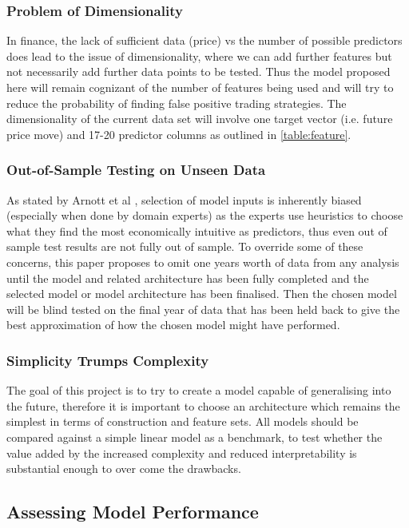 \documentclass[11pt]{article}
\begin{document}
\subsubsection{Problem of Dimensionality}
 In finance, the lack of sufficient data (price) vs the number of possible predictors does lead to the issue of dimensionality, where we can add further features but not necessarily add further data points to be tested. Thus the model proposed here will remain cognizant of the number of features being used and will try to reduce the probability of finding false positive trading strategies. The dimensionality of the current data set will involve one target vector (i.e. future price move) and 17-20 predictor columns as outlined in \ref{table:feature}.
\subsubsection{Out-of-Sample Testing on Unseen Data}
 As stated by Arnott et al \cite{Arnott2018}, selection of model inputs is inherently biased (especially when done by domain experts) as the experts use heuristics to choose what they find the most economically intuitive as predictors, thus even out of sample test results are not fully out of sample. To override some of these concerns, this paper proposes to omit one years worth of data from any analysis until the model and related architecture has been fully completed and the selected model or model architecture has been finalised. Then the chosen model will be blind tested on the final year of data that has been held back to give the best approximation of how the chosen model might have performed. 
\subsubsection{Simplicity Trumps Complexity}
The goal of this project is to try to create a model capable of generalising into the future, therefore it is important to choose an architecture which remains the simplest in terms of construction and feature sets. All models should be compared against a simple linear model as a benchmark, to test whether the value added by the increased complexity and reduced interpretability is substantial enough to over come the drawbacks. 

\subsection{Assessing Model Performance}
\end{document}
